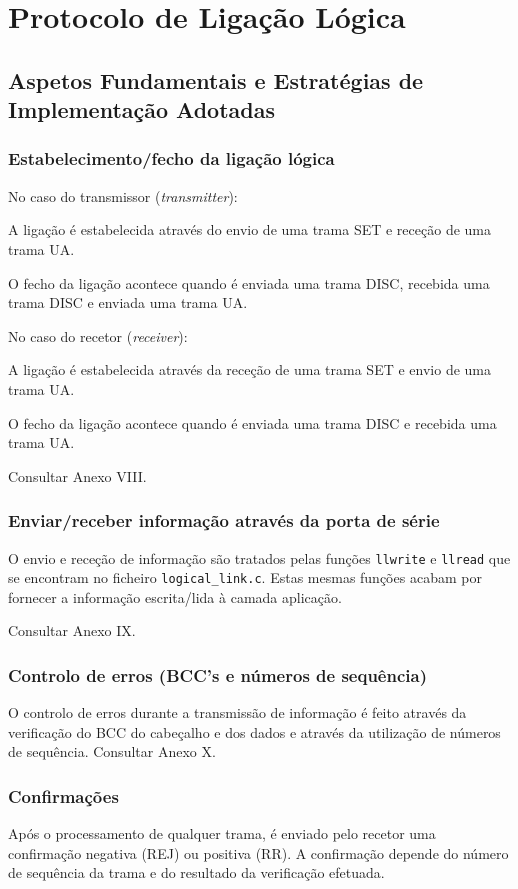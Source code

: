 \documentclass[article, a4paper, 11pt, oneside]{memoir}
\begin{document}
\chapter[Protocolo de Ligação Lógica][Protocolo de Ligação Lógica]{Protocolo de Ligação Lógica} \label{\thechapter}

\section{Aspetos Fundamentais e Estratégias de Implementação Adotadas}

\subsection{Estabelecimento/fecho da ligação lógica}
No caso do transmissor (\textit{transmitter}):

A ligação é estabelecida
através do envio de uma trama SET e receção de uma trama UA.

O fecho da ligação acontece quando é enviada uma trama DISC,
recebida uma trama DISC e enviada uma trama UA.

No caso do recetor (\textit{receiver}):

A ligação é estabelecida através da receção de uma trama SET
e envio de uma trama UA.

O fecho da ligação acontece quando é  enviada uma trama DISC
e recebida uma trama UA.

Consultar Anexo VIII.

\subsection{Enviar/receber informação através da porta de série}
O envio e receção de informação são tratados pelas funções \verb|llwrite| e \verb|llread| que
se encontram no ficheiro \verb|logical_link.c|. Estas mesmas funções acabam por fornecer 
a informação escrita/lida à camada aplicação.

Consultar Anexo IX.

\subsection{Controlo de erros (BCC's e números de sequência)}
O controlo de erros durante a transmissão de informação é feito através da verificação do BCC
do cabeçalho e dos dados e através da utilização de números de sequência.
Consultar Anexo X.

\subsection{Confirmações}
Após o processamento de qualquer trama, é enviado pelo recetor uma confirmação negativa (REJ) 
ou positiva (RR).
A confirmação depende do número de sequência da trama e do resultado da verificação efetuada.
\end{document}
